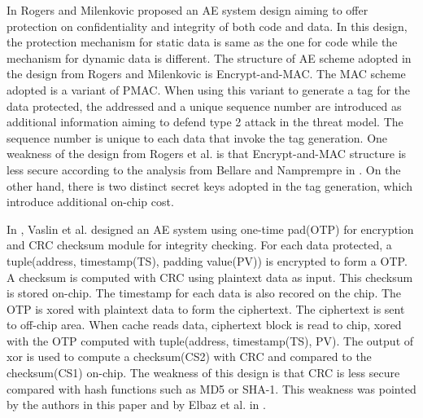 \documentclass{article}
\begin{document}
In \cite{rogers-MA} Rogers and Milenkovic proposed an AE system design aiming to offer protection on confidentiality and integrity of both code and data. In this design, the protection mechanism for static data is same as the one for code while the mechanism for dynamic data is different.
The structure of AE scheme adopted in the design from Rogers and Milenkovic is Encrypt-and-MAC. The MAC scheme adopted is a variant of PMAC. When using this variant to generate a tag for the data protected, the addressed and a unique sequence number are introduced as additional information aiming to defend type 2 attack in the threat model. The sequence number is unique to each data that invoke the tag generation.
One weakness of the design from Rogers et al. is that Encrypt-and-MAC structure is less secure according to the analysis from Bellare and Namprempre in \cite{ae-notion}. On the other hand, there is two distinct secret keys adopted in the tag generation, which introduce additional on-chip cost.

In \cite{vaslin-MA}, Vaslin et al. designed an AE system using one-time pad(OTP) for encryption and CRC checksum module for integrity checking. For each data protected, a tuple(address, timestamp(TS), padding value(PV)) is encrypted to form a OTP. A checksum is computed with CRC using plaintext data as input. This checksum is stored on-chip. The timestamp for each data is also recored on the chip. The OTP is xored with plaintext data to form the ciphertext. The ciphertext is sent to off-chip area. 
When cache reads data, ciphertext block is read to chip, xored with the OTP computed with tuple(address, timestamp(TS), PV). The output of xor is used to compute a checksum(CS2) with CRC and compared to the checksum(CS1) on-chip. 
The weakness of this design is that CRC is less secure compared with hash functions such as MD5 or SHA-1. This weakness was pointed by the authors in this paper and by Elbaz et al. in \cite{area}.



\end{document}
